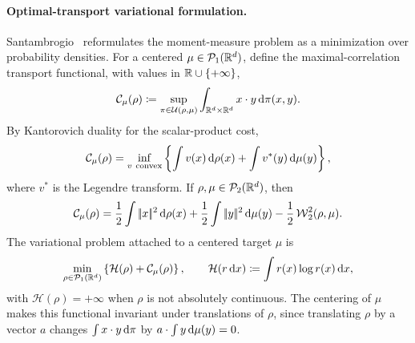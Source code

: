 \paragraph{Optimal-transport variational formulation.}
Santambrogio~\cite{Santambrogio2015MomentMeasures} reformulates the moment-measure problem as a minimization over probability densities. For a centered $\mu\in\mathcal{P}_1(\mathbb{R}^d)$, define the maximal-correlation transport functional, with values in $\mathbb{R}\cup\{+\infty\}$,
\begin{equation}\label{eq-moment-max-correlation}
	\mathcal C_\mu(\rho)
	\coloneqq
	\sup_{\pi\in\mathcal{U}(\rho,\mu)}
	\int_{\mathbb{R}^d\times\mathbb{R}^d} x\cdot y\,\mathrm{d}\pi(x,y).
\end{equation}
By Kantorovich duality for the scalar-product cost,
\begin{equation}\label{eq-moment-max-correlation-dual}
	\mathcal C_\mu(\rho)
	=
	\inf_{v\ \mathrm{convex}}
	\left\{
		\int v(x)\,\mathrm{d}\rho(x)+\int v^*(y)\,\mathrm{d}\mu(y)
	\right\},
\end{equation}
where $v^*$ is the Legendre transform. If $\rho,\mu\in\mathcal{P}_2(\mathbb{R}^d)$, then
\begin{equation}\label{eq-moment-correlation-w2}
	\mathcal C_\mu(\rho)
	=
	\frac12\int |\!| x |\!|^2\,\mathrm{d}\rho(x)
	+
	\frac12\int |\!| y |\!|^2\,\mathrm{d}\mu(y)
	-
	\frac12\operatorname{\mathcal{W}}_2^2(\rho,\mu).
\end{equation}
The variational problem attached to a centered target $\mu$ is
\begin{equation}\label{eq-moment-measure-variational}
	\min_{\rho\in\mathcal{P}_1(\mathbb{R}^d)}
	\left\{
		\mathcal H(\rho)+\mathcal C_\mu(\rho)
	\right\},
	\qquad
	\mathcal H(r\,\mathrm{d} x)\coloneqq \int r(x)\log r(x)\,\mathrm{d} x,
\end{equation}
with $\mathcal H(\rho)=+\infty$ when $\rho$ is not absolutely continuous.
The centering of $\mu$ makes this functional invariant under translations of $\rho$, since translating $\rho$ by a vector $a$ changes $\int x\cdot y\,\mathrm{d}\pi$ by $a\cdot\int y\,\mathrm{d}\mu(y)=0$.

